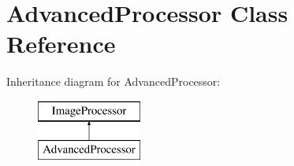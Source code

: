 \hypertarget{class_advanced_processor}{
\section{AdvancedProcessor Class Reference}
\label{class_advanced_processor}
}
Inheritance diagram for AdvancedProcessor:\begin{figure}[H]
\begin{center}
\leavevmode
\includegraphics[height=2.000000cm]{class_advanced_processor}
\end{center}
\end{figure}
